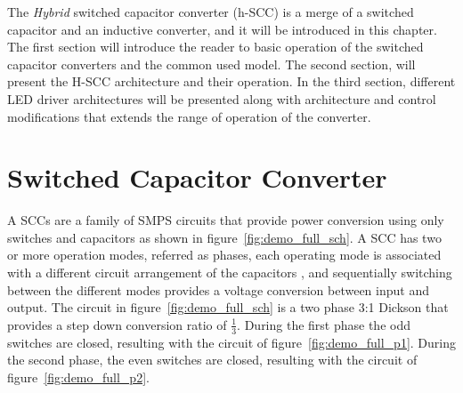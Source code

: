 The \emph{Hybrid} switched capacitor converter (h-SCC) is a merge of a switched capacitor and an inductive converter, and it will be introduced in this chapter. The first section will introduce the reader to basic operation of the switched capacitor converters and the common used model. The second section, will present the H-SCC architecture and their operation. In the third section, different LED driver architectures will be presented along with architecture and control modifications that extends the range of operation of the converter.

\section{Switched Capacitor Converter}

A SCCs are a family of SMPS circuits that provide power conversion using only switches and capacitors as shown in figure~\ref{fig:demo_full_sch}. A SCC has two or more operation modes, referred as phases, each operating mode is associated with a different circuit arrangement of the capacitors , and sequentially switching between the different modes provides a voltage conversion between input and output. The circuit in figure~\ref{fig:demo_full_sch} is a two phase 3:1 Dickson that provides a step down conversion ratio of $\frac{1}{3}$. During the first phase the odd switches are closed, resulting with the circuit of figure~\ref{fig:demo_full_p1}. During the second phase, the even switches are closed, resulting with the circuit of figure~\ref{fig:demo_full_p2}.

